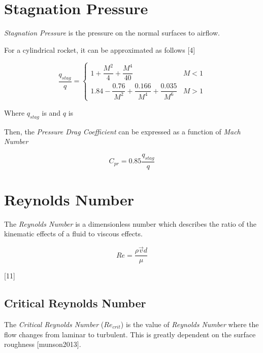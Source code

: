 \documentclass[]{book}
\begin{document}
\section{Stagnation Pressure}\label{stagnation-pressure}

\emph{Stagnation Pressure} is the pressure on the normal surfaces to
airflow.

For a cylindrical rocket, it can be approximated as follows {[}4{]}

\begin{equation}
\label{eq_stagnation_pressure_blunt_cylinder}
\dfrac{q_{stag}}{q} =  
\begin{cases}
    1 + \dfrac{M^2}{4} + \dfrac{M^4}{40}                                    & M < 1 \\
    1.84 - \dfrac{0.76}{M^2} + \dfrac{0.166}{M^4} + \dfrac{0.035}{M^6}      & M > 1
\end{cases}
\end{equation}

Where \(q_{stag}\) is and \(q\) is

Then, the \emph{Pressure Drag Coefficient} can be expressed as a
function of \emph{Mach Number}

\begin{equation}
\label{eq_pressure_drag_coefficient}
C_{pr} = 0.85 \dfrac{q_{stag}}{q}
\end{equation}

\section{Reynolds Number}\label{reynolds-number}

The \emph{Reynolds Number} is a dimensionless number which describes the
ratio of the kinematic effects of a fluid to viscous effects.

\begin{equation}
\label{eq_reynolds_number_theory}
Re = \dfrac{\rho \vec{v} d}{\mu}
\end{equation}

{[}11{]}

\subsection{Critical Reynolds Number}\label{critical-reynolds-number}

The \emph{Critical Reynolds Number} (\(Re_{crit}\)) is the value of
\emph{Reynolds Number} where the flow changes from laminar to turbulent.
This is greatly dependent on the surface roughness {[}munson2013{]}.
\end{document}
